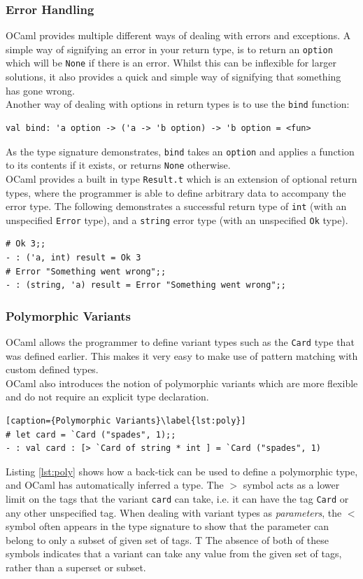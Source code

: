 \documentclass[12pt,a4paper,twoside,openright]{report}
\begin{document}
	\subsubsection*{Error Handling}
	OCaml provides multiple different ways of dealing with errors and exceptions. 
	A simple way of signifying an error in your return type, is to return an \texttt{option} which will be \texttt{None} if there is an error. 
	Whilst this can be inflexible for larger solutions, it also provides a quick and simple way of signifying that something has gone wrong.\\

	Another way of dealing with options in return types is to use the \texttt{bind} function:
	\begin{lstlisting}
val bind: 'a option -> ('a -> 'b option) -> 'b option = <fun>
	\end{lstlisting} 
	As the type signature demonstrates, \texttt{bind} takes an \texttt{option} and applies a function to its contents if it exists, or returns \texttt{None} otherwise.\\
	
	OCaml provides a built in type \texttt{Result.t} which is an extension of optional return types, where the programmer is able to define arbitrary data to accompany the error type. 
	The following demonstrates a successful return type of \texttt{int} (with an unspecified \texttt{Error} type), and a \texttt{string} error type (with an unspecified \texttt{Ok} type).
	\begin{lstlisting}
# Ok 3;;
- : ('a, int) result = Ok 3
# Error "Something went wrong";;
- : (string, 'a) result = Error "Something went wrong";;
	\end{lstlisting} 

	\subsubsection*{Polymorphic Variants}
	OCaml allows the programmer to define variant types such as the \texttt{Card} type that was defined earlier. This makes it very easy to make use of pattern matching with custom defined types.\\
	
	OCaml also introduces the notion of polymorphic variants which are more flexible and do not require an explicit type declaration.
	\begin{lstlisting}[caption={Polymorphic Variants}\label{lst:poly}]
# let card = `Card ("spades", 1);;
- : val card : [> `Card of string * int ] = `Card ("spades", 1)
	\end{lstlisting}
	Listing \ref{lst:poly} shows how a back-tick can be used to define a polymorphic type, and OCaml has automatically inferred a type. 
	The $>$ symbol acts as a lower limit on the tags that the variant \texttt{card} can take, i.e. it can have the tag \texttt{Card} or any other unspecified tag.
	When dealing with variant types as \textit{parameters}, the $<$ symbol often appears in the type signature to show that the parameter can belong to only a subset of given set of tags. T
	The absence of both of these symbols indicates that a variant can take any value from the given set of tags, rather than a superset or subset. 
\end{document}
